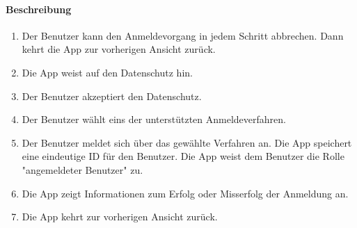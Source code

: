 \paragraph{Beschreibung}
\begin{enumerate}
      \item Der Benutzer kann den Anmeldevorgang in jedem Schritt abbrechen. Dann kehrt die App zur vorherigen Ansicht zurück.
      \item Die App weist auf den Datenschutz hin.
      \item Der Benutzer akzeptiert den Datenschutz.
      \item Der Benutzer wählt eins der unterstützten Anmeldeverfahren.
      \item Der Benutzer meldet sich über das gewählte Verfahren an.
       Die App speichert eine eindeutige ID für den Benutzer. Die App weist dem Benutzer die Rolle "angemeldeter Benutzer" zu.
      \item Die App zeigt Informationen zum Erfolg oder Misserfolg der Anmeldung an.
      \item Die App kehrt zur vorherigen Ansicht zurück. 
\end{enumerate}
